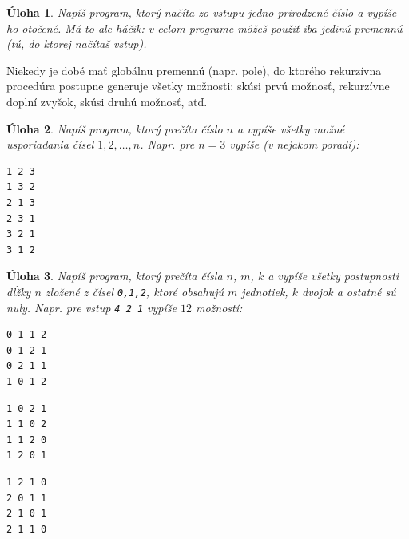 \documentclass[10pt]{article}
\def\ods{\vspace*{10pt}}
\newtheorem{uloha}{Úloha}
\begin{document}
\begin{uloha}
  Napíš program, ktorý načíta zo vstupu jedno prirodzené číslo a vypíše ho otočené.
  Má to ale háčik: v celom programe môžeš použiť iba jedinú premennú (tú, do 
  ktorej načítaš vstup).
\end{uloha}

Niekedy je dobé mať globálnu premennú (napr. pole), do ktorého rekurzívna procedúra
postupne generuje všetky možnosti: skúsi prvú možnosť, rekurzívne doplní zvyšok, skúsi
druhú možnosť, atď.


\begin{uloha}
Napíš program, ktorý prečíta číslo $n$ a vypíše všetky možné usporiadania
  čísel $1,2,\ldots,n$. Napr. pre $n=3$ vypíše (v nejakom poradí):
  \begin{verbatim}
1 2 3
1 3 2
2 1 3
2 3 1
3 2 1
3 1 2
\end{verbatim}
\end{uloha}

\begin{uloha}
Napíš program, ktorý prečíta čísla $n$, $m$, $k$
  a vypíše všetky postupnosti dĺžky $n$ zložené z čísel {\tt 0,1,2}, ktoré obsahujú
  $m$ jednotiek, $k$ dvojok a ostatné sú nuly. Napr. pre vstup {\tt 4 2 1} vypíše
  $12$ možností:

  \ods
\begin{minipage}[t]{0.3\textwidth}
\begin{verbatim}
0 1 1 2 
0 1 2 1 
0 2 1 1 
1 0 1 2 
\end{verbatim}
\end{minipage}
\hfill
\begin{minipage}[t]{0.3\textwidth}
\begin{verbatim}
1 0 2 1 
1 1 0 2 
1 1 2 0 
1 2 0 1 
\end{verbatim}
\end{minipage}
\hfill
\begin{minipage}[t]{0.3\textwidth}
\begin{verbatim}
1 2 1 0 
2 0 1 1 
2 1 0 1 
2 1 1 0
\end{verbatim}
\end{minipage}

\end{uloha}
\end{document}
